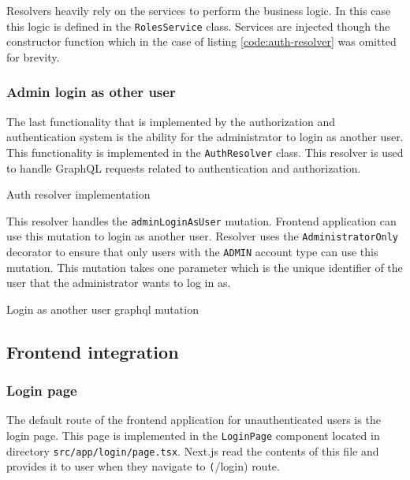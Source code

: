 \documentclass[../main.tex]{subfiles}
\begin{document}
Resolvers heavily rely on the services to perform the business logic. In this case this logic is defined in the \texttt{RolesService} class.
Services are injected though the constructor function which in the case of listing \ref{code:auth-resolver} was omitted for brevity.


\subsubsection{Admin login as other user}

The last functionality that is implemented by the authorization and authentication system is the ability for the administrator to login as another user.
This functionality is implemented in the \texttt{AuthResolver} class. This resolver is used to handle GraphQL requests related to authentication and authorization.

\begin{listing}[H]
  \caption{Auth resolver implementation}
  \label{code:auth-resolver}
\end{listing}

This resolver handles the \texttt{adminLoginAsUser} mutation. Frontend application can use this mutation to login as another user.
Resolver uses the \texttt{AdministratorOnly} decorator to ensure that only users with the \texttt{ADMIN} account type can use this mutation.
This mutation takes one parameter which is the unique identifier of the user that the administrator wants to log in as.

\begin{listing}[H]
  \caption{Login as another user graphql mutation}
  \label{code:login-as-mutation}
\end{listing}

\subsection{Frontend integration}

\subsubsection{Login page}

The default route of the frontend application for unauthenticated users is the login page. This page is implemented in the \texttt{LoginPage} component
located in directory \texttt{src/app/login/page.tsx}. Next.js read the contents of this file and provides it to user when they navigate to \texttt(/login) route.
\end{document}
